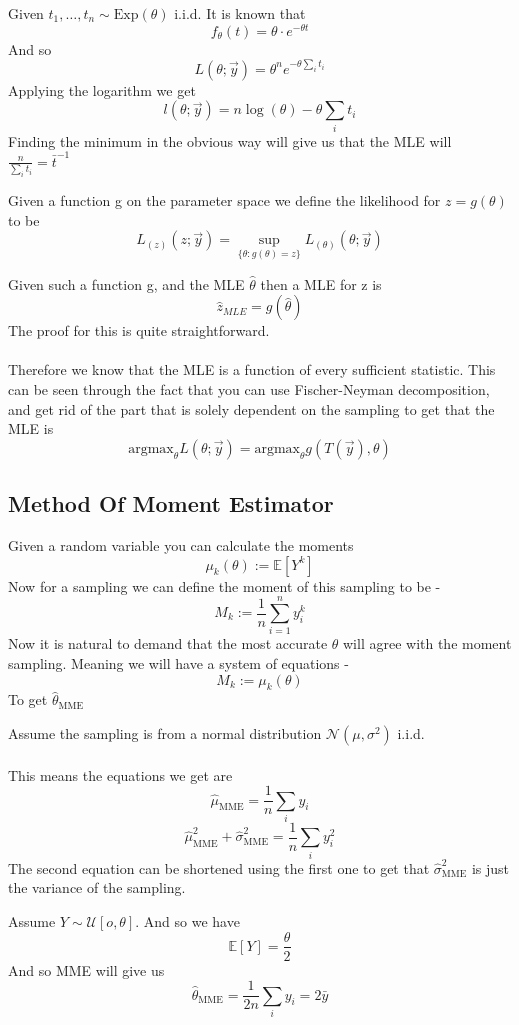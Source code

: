 \documentclass[../main.tex]{subfiles}
\begin{document}
\begin{example} Given $t_1,\dots,t_n\sim\text{Exp}(\theta)$ i.i.d.
It is known that
\[f_\theta(t) = \theta\cdot e^{-\theta t}\]
And so 
\[L(\theta;\overrightarrow{y}) = \theta^n e^{-\theta\sum_i t_i}\]
Applying the logarithm we get 
\[l(\theta;\overrightarrow{y})=n\log(\theta)-\theta\sum_i t_i\]
Finding the minimum in the obvious way will give us that the MLE will $\frac{n}{\sum_i t_i} = \bar{t}^{-1}$\end{example}
\begin{definition} Given a function g on the parameter space we define the likelihood for $z=g(\theta)$ to be 
\[L_{(z)}(z;\overrightarrow{y}) = \sup_{\{\theta:g(\theta)=z\}} L_{(\theta)}(\theta;\overrightarrow{y})\]
\end{definition}
\begin{claim} Given such a function g, and the MLE $\hat{\theta}$ then a MLE for z is 
\[\hat{z}_{MLE}=g(\hat{\theta})\]
The proof for this is quite straightforward. \\\\
Therefore we know that the MLE is a function of every sufficient statistic. This can be seen through the fact that you can use Fischer-Neyman decomposition, and get rid of the part that is solely dependent on the sampling to get that the MLE is \[\text{argmax}_\theta L(\theta;\overrightarrow{y})=\text{argmax}_\theta g(T(\overrightarrow{y}),\theta)\]
\end{claim}
\newpage
\subsection{Method Of Moment Estimator}
Given a random variable you can calculate the moments
\[\mu_k(\theta):= \mathbb{E}\left[Y^k\right]\]
Now for a sampling we can define the moment of this sampling to be -
\[M_k:=\frac{1}{n}\sum_{i=1}^n y_i^k\]
Now it is natural to demand that the most accurate $\theta$ will agree with the moment sampling. Meaning we will have a system of equations - 
\[M_k:=\mu_k(\theta)\]
To get $\hat{\theta}_{\text{MME}}$
\begin{example}
Assume the sampling is from a normal distribution $\mathcal{N}(\mu,\sigma^2)$ i.i.d.\\\\
This means the equations we get are
\[\hat{\mu}_{\text{MME}}=\frac{1}{n}\sum_i y_i\]
\[\hat{\mu}_{\text{MME}}^2+\hat{\sigma}_{\text{MME}}^2 = \frac{1}{n}\sum_i y_i^2\]
The second equation can be shortened using the first one to get that $\hat{\sigma}_{\text{MME}}^2$ is just the variance of the sampling. \end{example}
\begin{example} Assume $Y\sim\mathcal{U}[o,\theta]$. And so we have \[\mathbb{E}[Y]=\frac{\theta}{2} \]
And so MME will give us 
\[\hat{\theta}_{\text{MME}}=\frac{1}{2n}\sum_i y_i=2\bar{y}\]
\end{example}
\newpage
\end{document}
